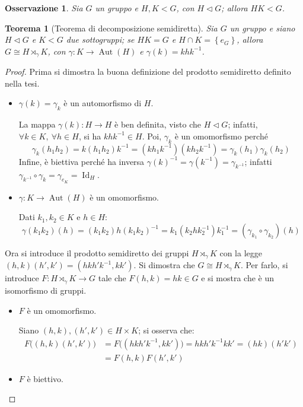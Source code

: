 \documentclass[11pt]{article}
\theoremstyle{style}
\newtheorem{teorema}{Teorema}[section]
\newtheorem{osservazione}{Osservazione}[section]
\numberwithin{equation}{subsection}
\begin{document}
\begin{osservazione}
	Sia $G$ un gruppo e $H,K < G$, con $H \lhd G$; allora $HK < G$.
\end{osservazione}
\begin{teorema}
	[Teorema di decomposizione semidiretta]\label{scth}
	Sia $G$ un gruppo e siano $H \lhd G$ e $K < G$ due sottogruppi; se $HK = G$ e $H \cap K = \left\{ e_G \right\} $, allora $G \cong H \rtimes _\gamma K$, con $\gamma: K \to \operatorname{Aut} (H)$ e $\gamma(k) = k hk^{-1}$.
\end{teorema}
	\begin{proof}
		Prima si dimostra la buona definizione del prodotto semidiretto definito nella tesi.
		\begin{itemize}
			\item $\gamma(k)=\gamma_k$ \`e un automorfismo di $H$.

				La mappa $\gamma(k):H\to H$ \`e ben definita, visto che $H\lhd G$; infatti, $\forall k \in  K, \ \forall h \in H$, si ha $k h k^{-1}\in H$.
				Poi, $\gamma_k$ \`e un omomorfismo perch\'e
				\[
				\gamma_k (h_1h_2) = k (h_1h_2) k^{-1} = (kh_1k^{-1})(k h_2k^{-1}) = \gamma_k(h_1) \gamma_k(h_2)
				\] 
				Infine, \`e biettiva perch\'e ha inversa $\gamma(k)^{-1} =\gamma(k^{-1})= \gamma_{k^{-1}} $; infatti $\gamma_{k^{-1}} \circ \gamma_k = \gamma_{e_K}  = \operatorname{Id} _H$.
			\item $\gamma : K \to \operatorname{Aut} (H)$ \`e un omomorfismo.

				Dati $k_1,k_2 \in K$ e $h \in H$:
\[
\gamma(k_1k_2)(h) = (k_1k_2)h(k_1k_2)^{-1} = k_1(k_2hk_2^{-1})k_1^{-1}= (\gamma_{k_1} \circ \gamma_{k_2} )(h)
\] 
		\end{itemize}
		Ora si introduce il prodotto semidiretto dei gruppi $H \rtimes _\gamma K$ con la legge $(h,k)(h',k') = (hkh'k^{-1},k k')$.
		Si dimostra che $G \cong H \rtimes _\gamma K$.
		Per farlo, si introduce $F : H \rtimes _\gamma K \to G$ tale che $F(h,k) = hk \in G$ e si mostra che \`e un isomorfismo di gruppi.
		\begin{itemize}
			\item $F$ \`e un omomorfismo.

				Siano $(h,k), (h',k') \in H \times K$; si osserva che:
				\[
					\begin{split}
						F\big((h,k)(h',k')\big) &= F\big((hkh'k^{-1},k k')\big) = hkh'k^{-1} k k'= (hk)(h'k')\\
									&= F(h,k) F(h',k')
					\end{split}
				\] 
			\item $F$ \`e biettivo.


\end{itemize}
\end{proof}
\end{document}
